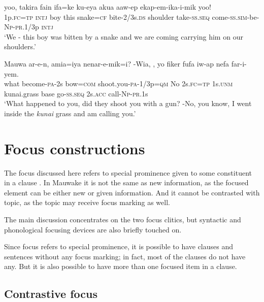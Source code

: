 \ea%
\label{ex:9:x1686}
\gll {}  yoo,  takira  fain  ifa=ke  ku-eya  akua aaw-ep  ekap-em-ika-i-mik  yoo! \\
1p.\textsc{fc}=\textsc{tp}  \textsc{intj}  boy  this  snake=\textsc{cf}  bite-2/3s.\textsc{ds}  shoulder take-\textsc{ss}.\textsc{seq}  come-\textsc{ss}.\textsc{sim}-be-\textsc{Np}-\textsc{pr}.1/3p  \textsc{intj}     \\
\glt`We - this boy was bitten by a snake and we are coming carrying him on our shoulders.'
\z


\ea%
\label{ex:9:x1687}
\gll Mauwa  ar-e-n,  amia=iya  nenar-e-mik=i? -Wia,  ,  yo  fiker  fufa  iw-ap  nefa far-i-yem.\\
what  become-\textsc{pa}-2s  bow=\textsc{com}  shoot.you-\textsc{pa}-1/3p=\textsc{qm} No  2s.\textsc{fc}=\textsc{tp}  1s.\textsc{unm}  kunai.grass  base  go-\textsc{ss}.\textsc{seq}  2s.\textsc{acc} call-\textsc{Np}-\textsc{pr}.1s    \\
\glt`What happened to you, did they shoot you with a gun? -No, you know, I went inside the \textit{kunai} grass and am calling you.'
\z


\section{Focus constructions}{\footnotemark}

The focus discussed here refers to special prominence given to some constituent in a clause \citep[174]{Dixon2010a}. In Mauwake it is not the same as new information, as the focused element can be either new or given information. And it cannot be contrasted with topic, as the topic may receive focus marking as well. 

The main discussion concentrates on the two focus clitics, but syntactic and phonological focusing devices are also briefly touched on.

Since focus refers to special prominence, it is possible to have clauses and sentences without any focus marking; in fact, most of the clauses do not have any. But it is also possible to have more than one focused item in a clause. 

\subsection{Contrastive focus} \label{sec:9.3.1}

